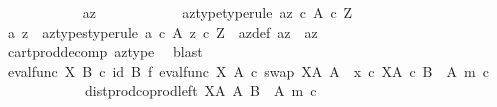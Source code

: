 \begin{isabellebody}
\ \ \ \ \ \ \ \ \ \ \isamarkupfalse%
\ az\isanewline
\ \ \ \ \ \ \ \ \ \ \isamarkupfalse%
\ az{\isacharunderscore}{\kern0pt}type{\isacharbrackleft}{\kern0pt}type{\isacharunderscore}{\kern0pt}rule{\isacharbrackright}{\kern0pt}{\isacharcolon}{\kern0pt}\ {\isachardoublequoteopen}az\ {\isasymin}\isactrlsub c\ A\ {\isasymtimes}\isactrlsub c\ Z{\isachardoublequoteclose}\isanewline
\isanewline
\ \ \ \ \ \ \ \ \ \ \isamarkupfalse%
\ a\ z\ \ az{\isacharunderscore}{\kern0pt}types{\isacharbrackleft}{\kern0pt}type{\isacharunderscore}{\kern0pt}rule{\isacharbrackright}{\kern0pt}{\isacharcolon}{\kern0pt}\ {\isachardoublequoteopen}a\ {\isasymin}\isactrlsub c\ A{\isachardoublequoteclose}\ {\isachardoublequoteopen}z\ {\isasymin}\isactrlsub c\ Z{\isachardoublequoteclose}\ \ az{\isacharunderscore}{\kern0pt}def{\isacharcolon}{\kern0pt}\ {\isachardoublequoteopen}az\ {\isacharequal}{\kern0pt}\ {\isasymlangle}a{\isacharcomma}{\kern0pt}z{\isasymrangle}{\isachardoublequoteclose}\isanewline
\ \ \ \ \ \ \ \ \ \ \ \ \isamarkupfalse%
\ cart{\isacharunderscore}{\kern0pt}prod{\isacharunderscore}{\kern0pt}decomp\ az{\isacharunderscore}{\kern0pt}type\ \isamarkupfalse%
\ blast\isanewline
\isanewline
\ \ \ \ \ \ \ \ \ \ \isamarkupfalse%
\ {\isachardoublequoteopen}{\isacharparenleft}{\kern0pt}eval{\isacharunderscore}{\kern0pt}func\ X\ B{\isacharparenright}{\kern0pt}\ {\isasymcirc}\isactrlsub c\ {\isacharparenleft}{\kern0pt}id\ B\ {\isasymtimes}\isactrlsub f\ {\isacharparenleft}{\kern0pt}{\isacharparenleft}{\kern0pt}{\isacharparenleft}{\kern0pt}eval{\isacharunderscore}{\kern0pt}func\ X\ A\ {\isasymcirc}\isactrlsub c\ swap\ {\isacharparenleft}{\kern0pt}X\isactrlbsup A\isactrlesup {\isacharparenright}{\kern0pt}\ A{\isacharparenright}{\kern0pt}\ {\isasymamalg}\ {\isacharparenleft}{\kern0pt}x\ {\isasymcirc}\isactrlsub c\ {\isasymbeta}\isactrlbsub X\isactrlbsup A\isactrlesup \ {\isasymtimes}\isactrlsub c\ {\isacharparenleft}{\kern0pt}B\ {\isasymsetminus}\ {\isacharparenleft}{\kern0pt}A{\isacharcomma}{\kern0pt}\ m{\isacharparenright}{\kern0pt}{\isacharparenright}{\kern0pt}\isactrlesub {\isacharparenright}{\kern0pt}\ {\isasymcirc}\isactrlsub c\isanewline
\ \ \ \ \ \ \ \ \ \ \ \ dist{\isacharunderscore}{\kern0pt}prod{\isacharunderscore}{\kern0pt}coprod{\isacharunderscore}{\kern0pt}left\ {\isacharparenleft}{\kern0pt}X\isactrlbsup A\isactrlesup {\isacharparenright}{\kern0pt}\ A\ {\isacharparenleft}{\kern0pt}B\ {\isasymsetminus}\ {\isacharparenleft}{\kern0pt}A{\isacharcomma}{\kern0pt}\ m{\isacharparenright}{\kern0pt}{\isacharparenright}{\kern0pt}\ {\isasymcirc}\isactrlsub c\isanewline

\end{isabellebody}
